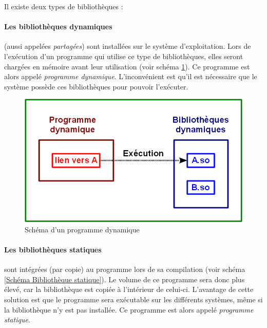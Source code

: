 Il existe deux types de bibliothèques :

\paragraph{Les bibliothèques dynamiques}
(aussi appelées \textit{partagées}) sont installées sur le système d'exploitation.
Lors de l'exécution d'un programme qui utilise ce type de bibliothèques, elles seront chargées en mémoire avant leur utilisation (voir schéma \ref{Schéma Bibliothèque dynamique}).
Ce programme est alors appelé \textit{programme dynamique}.
L'inconvénient est qu'il est nécessaire que le système possède ces bibliothèques pour pouvoir l'exécuter.

\begin{figure}[!h]
	\center
	\includegraphics[scale=0.5]{img/Bibliotheque_dynamique.png}
	\caption{Schéma d'un programme dynamique}
	\label{Schéma Bibliothèque dynamique}
\end{figure}


\paragraph{Les bibliothèques statiques}
sont intégrées (par copie) au programme lors de sa compilation (voir schéma \ref{Schéma Bibliothèque statique}).
Le volume de ce programme sera donc plus élevé, car la bibliothèque est copiée à l'intérieur de celui-ci.
L'avantage de cette solution est que le programme sera exécutable sur les différents systèmes, même si la bibliothèque n'y est pas installée.
Ce programme est alors appelé \textit{programme statique}.

